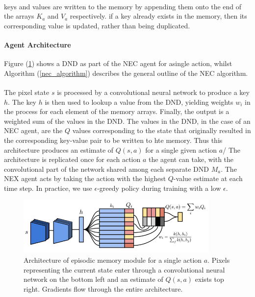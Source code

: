 \paragraph{} keys and values are written to the memory by appending them onto the end of the arrays $K_{a}$ and $V_{a}$ respectively. if a key already exists in the memory, then its corresponding value is updated, rather than being duplicated.
\paragraph{Agent Architecture}
Figure (\ref{nec_agent_architecture_figure}) shows a DND as part of the NEC agent for asingle action, whilst Algorithm (\ref{nec_algorithm}) describes the general outline of the NEC algorithm. 
\paragraph{} The pixel state $s$ is processed by a convolutional neural network to produce a key $h$. The key $h$ is then used to lookup a value from the DND, yielding weights $w_i$ in the process for each element of the memory arrays. Finally, the output is a weighted sum of the values in the DND. The values in the DND, in the case of an NEC agent, are the $Q$ values corresponding to the state that originally resulted in the corresponding key-value pair to be written to hte memory. Thus this architecture produces an estimate of $Q(s, a)$ for a single given action $a$/ The architecture is replicated once for each action $a$ the agent can take, with the convolutional part of the network shared among each separate DND $M_a$. The NEX agent acts by taking the action with the highest $Q$-value estimate at each time step. In practice, we use $\epsilon$-greedy policy during training with a low $\epsilon$.
\begin{figure}
\centering
\includegraphics[width=10cm]{pic/nec_agent_architecture.PNG}
\caption{Architecture of episodic memory module for a single action $a$. Pixels representing the current state enter through a convolutional neural network on the bottom left and an estimate of $Q(s, a)$ exists top right. Gradients flow through the entire architecture.} 
\label{nec_agent_architecture_figure}
\end{figure}
